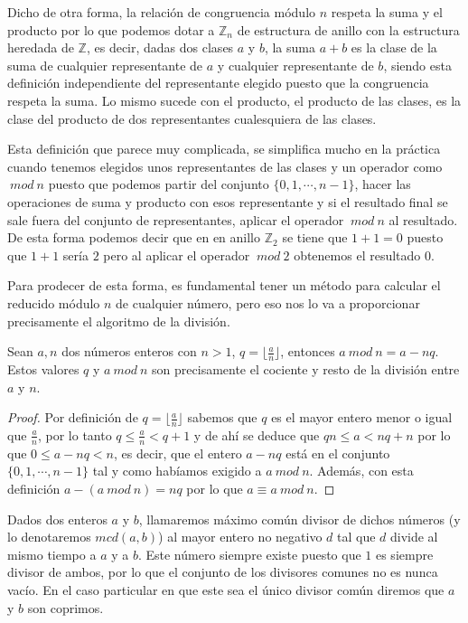 Dicho de otra forma, la relaci\'on de congruencia m\'odulo $n$ respeta la suma y el
producto por lo que podemos dotar a ${\mathbb Z}_n$ de estructura de anillo con la
estructura heredada de ${\mathbb Z}$, es decir, dadas dos clases $a$ y $b$, la suma
$a+b$ es la clase de la suma de cualquier representante de $a$ y cualquier
representante de $b$, siendo esta definici\'on independiente del representante
elegido puesto que la congruencia respeta la suma. Lo mismo sucede con el producto,
el producto de las clases, es la clase del producto de dos representantes
cualesquiera de las clases.

Esta definici\'on que parece muy complicada, se simplifica mucho en la pr\'actica
cuando tenemos elegidos unos representantes de las clases y un operador como $~mod~n$
puesto que podemos partir del conjunto $\{0,1,\cdots,n-1\}$, hacer las operaciones de suma
y producto con esos representante y si el resultado final se sale fuera del conjunto de
representantes, aplicar el operador $~mod~n$ al resultado. De esta forma podemos decir
que en en anillo ${\mathbb Z}_2$ se tiene que $1+1=0$ puesto que $1+1$ ser\'ia $2$
pero al aplicar el operador $~mod~2$ obtenemos el resultado $0$.

Para prodecer de esta forma, es fundamental tener un m\'etodo para calcular el reducido
m\'odulo $n$ de cualquier n\'umero, pero eso nos lo va a proporcionar precisamente el
algoritmo de la divisi\'on.

\begin{proposition}
Sean $a,n$ dos n\'umeros enteros con $n > 1$, $q = \lfloor \frac{a}{n} \rfloor$,
entonces $a~mod~n = a-nq$. Estos valores $q$ y $a~mod~n$ son precisamente el
cociente y resto de la divisi\'on entre $a$ y $n$.
\end{proposition}
\begin{proof}
Por definici\'on de $q = \lfloor \frac{a}{n} \rfloor$ sabemos que $q$ es el mayor entero
menor o igual que $\frac{a}{n}$, por lo tanto $q \leq \frac{a}{n} < q+1$ y de ah\'i se
deduce que $qn \leq a < nq+n$ por lo que $0 \leq a-nq < n$, es decir, que el entero
$a-nq$ est\'a en el conjunto $\{0,1,\cdots,n-1\}$ tal y como hab\'iamos exigido a
$a~mod~n$. Adem\'as, con esta definici\'on $a-(a~mod~n) = nq$ por lo que
$a \equiv a~mod~n$.
\end{proof}

\begin{definition}
Dados dos enteros $a$ y $b$, llamaremos m\'aximo com\'un divisor de dichos n\'umeros
(y lo denotaremos $mcd(a,b)$)
al mayor entero no negativo $d$ tal que $d$ divide al mismo tiempo a $a$ y a $b$. Este
n\'umero siempre existe puesto que $1$ es siempre divisor de ambos, por lo que el conjunto
de los divisores comunes no es nunca vac\'io. En el caso particular en que este sea el
\'unico divisor com\'un diremos que $a$ y $b$ son coprimos.
\end{definition}

